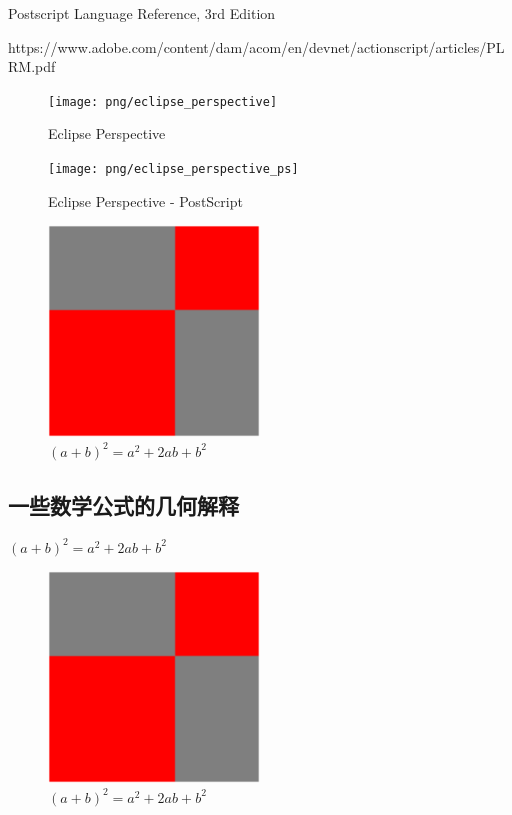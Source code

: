 \documentclass[main.tex]{subfiles}
\begin{document}
	Postscript Language Reference, 3rd Edition \cite{PSLF3}
	
	https://www.adobe.com/content/dam/acom/en/devnet/actionscript/articles/PLRM.pdf
	
\begin{figure}[h]
	\centering
	\texttt{[image: png/eclipse\_perspective]}
	\caption{Eclipse Perspective}
	\label{fig:III.1.1}
\end{figure}

\begin{figure}[h]
	\centering
	\texttt{[image: png/eclipse\_perspective\_ps]}
	\caption{Eclipse Perspective - PostScript}
	\label{fig:III.1.1}
\end{figure}

\begin{figure}[h]
	\centering
	\includegraphics[width=0.5\textwidth]{images/ps.1.1.eps}
	\caption{$(a+b)^2 = a^2 + 2ab + b^2$}
	\label{fig:III.1.1}
\end{figure}	
	
	
	
\subsection{一些数学公式的几何解释}
$(a+b)^2 = a^2 + 2ab + b^2$


\begin{figure}[h]
    \centering
    \includegraphics[width=0.5\textwidth]{images/ps.1.1.eps}
    \caption{$(a+b)^2 = a^2 + 2ab + b^2$}
    \label{fig:III.1.1}
\end{figure}
\end{document}
